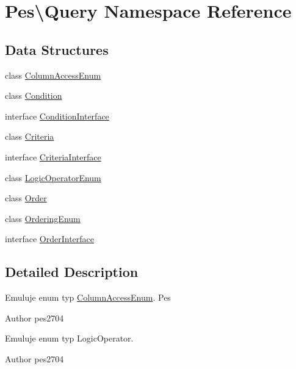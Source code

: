 \hypertarget{namespace_pes_1_1_query}{}\section{Pes\textbackslash{}Query Namespace Reference}
\label{namespace_pes_1_1_query}
\subsection*{Data Structures}
\begin{DoxyCompactItemize}
\item 
class \mbox{\hyperlink{class_pes_1_1_query_1_1_column_access_enum}{Column\+Access\+Enum}}
\item 
class \mbox{\hyperlink{class_pes_1_1_query_1_1_condition}{Condition}}
\item 
interface \mbox{\hyperlink{interface_pes_1_1_query_1_1_condition_interface}{Condition\+Interface}}
\item 
class \mbox{\hyperlink{class_pes_1_1_query_1_1_criteria}{Criteria}}
\item 
interface \mbox{\hyperlink{interface_pes_1_1_query_1_1_criteria_interface}{Criteria\+Interface}}
\item 
class \mbox{\hyperlink{class_pes_1_1_query_1_1_logic_operator_enum}{Logic\+Operator\+Enum}}
\item 
class \mbox{\hyperlink{class_pes_1_1_query_1_1_order}{Order}}
\item 
class \mbox{\hyperlink{class_pes_1_1_query_1_1_ordering_enum}{Ordering\+Enum}}
\item 
interface \mbox{\hyperlink{interface_pes_1_1_query_1_1_order_interface}{Order\+Interface}}
\end{DoxyCompactItemize}


\subsection{Detailed Description}
Emuluje enum typ \mbox{\hyperlink{class_pes_1_1_query_1_1_column_access_enum}{Column\+Access\+Enum}}.  Pes

\begin{DoxyAuthor}{Author}
pes2704
\end{DoxyAuthor}
Emuluje enum typ Logic\+Operator.

\begin{DoxyAuthor}{Author}
pes2704 
\end{DoxyAuthor}
